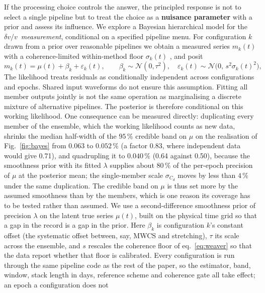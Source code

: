 \documentclass[
  referee]{gji}
\providecommand{\dvv}{\ensuremath{\delta v/v}}
\begin{document}
If the processing choice controls the answer, the principled response is
not to select a single pipeline but to treat the choice as a
\textbf{nuisance parameter} with a prior and assess its influence. We
explore a Bayesian hierarchical model for the \dvv~\emph{measurement},
conditional on a specified pipeline menu. For configuration \(k\) drawn
from a prior over reasonable pipelines we obtain a measured series
\(m_k(t)\) with a coherence-limited within-method floor \(\sigma_k(t)\)
\citep{Weaver2011, Clarke2011}, and posit \begin{equation}
m_k(t) = \mu(t) + \beta_k + \varepsilon_k(t), \qquad
\beta_k\sim\mathcal N(0,\tau^2),\quad
\varepsilon_k(t)\sim\mathcal N\!\big(0,\,s^2\sigma_k(t)^2\big),
\label{eq:bayes}
\end{equation} The likelihood treats residuals as conditionally
independent across configurations and epochs. Shared input waveforms do
not ensure this assumption. Fitting all member outputs jointly is not
the same operation as marginalising a discrete mixture of alternative
pipelines. The posterior is therefore conditional on this working
likelihood. One consequence can be measured directly: duplicating every
member of the ensemble, which the working likelihood counts as new data,
shrinks the median half-width of the \(95\,\%\) credible band on \(\mu\)
on the realisation of Fig.~\ref{fig:bayes} from \(0.063\) to
\(0.052\,\%\) (a factor 0.83, where independent data would give 0.71),
and quadrupling it to \(0.040\,\%\) (0.64 against 0.50), because the
smoothness prior with its fitted \(\lambda\) supplies about \(80\,\%\)
of the per-epoch precision of \(\mu\) at the posterior mean; the
single-member scale \(\sigma_{C_d}\) moves by less than \(4\,\%\) under
the same duplication. The credible band on \(\mu\) is thus set more by
the assumed smoothness than by the members, which is one reason its
coverage has to be tested rather than assumed. We use a
second-difference smoothness prior of precision \(\lambda\) on the
latent true series \(\mu(t)\), built on the physical time grid so that a
gap in the record is a gap in the prior. Here \(\beta_k\) is
configuration \(k\)'s constant offset (the systematic offset between,
say, MWCS and stretching), \(\tau\) its scale across the ensemble, and
\(s\) rescales the coherence floor of eq.~\ref{eq:weaver} so that the
data report whether that floor is calibrated. Every configuration is run
through the same pipeline code as the rest of the paper, so the
estimator, band, window, stack length in days, reference scheme and
coherence gate all take effect; an epoch a configuration does not
\end{document}
